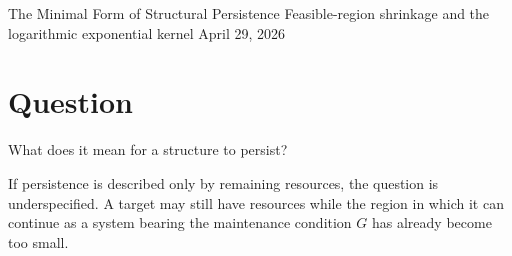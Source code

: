 \documentclass[12pt,a4paper]{article}
\begin{document}
\PaperTitleBlock
  {The Minimal Form of Structural Persistence}
  {Feasible-region shrinkage and the logarithmic exponential kernel}
  {April 29, 2026}

\begin{abstract}
A structure can fail before its resources literally vanish. Constraints may accumulate until the region in which a substrate can continue as a system bearing the maintenance condition \(G\) becomes too small, or disappears entirely. This paper gives the minimal formal expression of that fact.

For a pre-fixed structural maintenance problem, consider a nested sequence of feasible regions

\[
V^{(0)} \supseteq V^{(1)} \supseteq \cdots \supseteq V^{(n)}.
\]

Under natural axioms for measuring structural consumption - dependence only on survival ratios, normalization, additivity under composition, and continuity - the loss scale is uniquely logarithmic:

\[
f(\rho)=-k\log \rho.
\]

With \(k=1\), cumulative structural consumption satisfies

\[
m(V^{(n)})=m(V^{(0)})e^{-L_{n}}.
\]

The exponential kernel is therefore not an additional empirical decay law. It is the telescoping form forced by log-ratio measurement on a pre-fixed feasible region.

Finally, an effective maintenance surplus term \(M\) is introduced externally as a resource-side scalar, yielding the reader-facing persistence quantity

\[
S=Me^{-L}.
\]

The term \(M\) is not derived from the exponential kernel. It represents the effective maintenance surplus available to support the structure. The new law-side coordinate in this paper is \(L\), the logarithmic shrinkage of the feasible region.
\end{abstract}

\section{Question}\label{question}

What does it mean for a structure to persist?

If persistence is described only by remaining resources, the question is underspecified. A target may still have resources while the region in which it can continue as a system bearing the maintenance condition \(G\) has already become too small.
\end{document}
